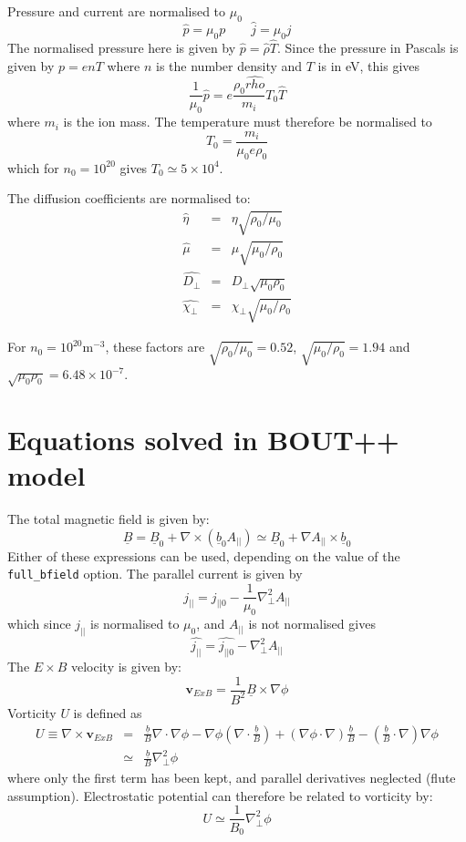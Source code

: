 \documentclass[12pt]{article}
\newcommand{\Vec}[1]{\ensuremath{\mathbf{#1}}}
\newcommand{\Div}[1]{\ensuremath{\nabla\cdot #1 }}
\newcommand{\Curl}[1]{\ensuremath{\nabla\times #1 }}
\newcommand{\Bvec}{\ensuremath{\underline{B}}}
\newcommand{\bvec}{\ensuremath{\underline{b}}}
\newcommand{\apar}{\ensuremath{A_{||}}}
\begin{document}
Pressure and current are normalised to $\mu_0$
\[
\hat{p} = \mu_0 p \qquad \hat{j} = \mu_0 j
\]
The normalised pressure here is given by $\hat{p} = \hat{\rho}\hat{T}$.
Since the pressure in Pascals is given by $p = enT$ where $n$ is the number
density and $T$ is in eV, this gives
\[
\frac{1}{\mu_0}\hat{p} = e\frac{\rho_0\hat{rho}}{m_i} T_0\hat{T}
\]
where $m_i$ is the ion mass. The temperature must therefore be normalised to
\[
T_0 = \frac{m_i}{\mu_0 e \rho_0}
\]
which for $n_0=10^{20}$ gives $T_0\simeq 5\times 10^4$.

The diffusion coefficients are normalised to:
\begin{eqnarray*}
\hat{\eta} &=& \eta\sqrt{\rho_0 / \mu_0} \\
\hat{\mu} &=& \mu\sqrt{\mu_0/\rho_0} \\
\hat{D_\perp} &=& D_\perp\sqrt{\mu_0\rho_0} \\
\hat{\chi_\perp} &=& \chi_\perp\sqrt{\mu_0/\rho_0}
\end{eqnarray*}

For $n_0=10^{20}$m$^{-3}$, these factors are $\sqrt{\rho_0 / \mu_0} = 0.52$, $\sqrt{\mu_0/\rho_0}=1.94$ and $\sqrt{\mu_0\rho_0} = 6.48\times 10^{-7}$. 

\section{Equations solved in BOUT++ model}

The total magnetic field is given by:
\[
\Bvec = \Bvec_0 + \nabla\times\left(\bvec_0\apar\right) \simeq \Bvec_0 + \nabla\apar \times\bvec_0
\]
Either of these expressions can be used, depending on the value of the \texttt{full\_bfield} option. The parallel current is given by
\[
j_{||} = j_{||0} - \frac{1}{\mu_0}\nabla_\perp^2\apar
\]
which since $j_{||}$ is normalised to $\mu_0$, and $\apar$ is not normalised gives
\[
\hat{j_{||}} = \hat{j_{||0}} - \nabla_\perp^2\apar
\]
The $E\times B$ velocity is given by:
\[
\Vec{v}_{ExB} = \frac{1}{B^2}\Bvec\times\nabla\phi
\]
Vorticity $U$ is defined as 
\begin{eqnarray*}
U \equiv \Curl{\Vec{v}_{ExB}} &=& \frac{\bvec}{B}\Div{\nabla\phi} - \nabla\phi\left(\Div{\frac{\bvec}{B}}\right) + \left(\nabla\phi\cdot\nabla\right)\frac{\bvec}{B} - \left(\frac{\bvec}{B}\cdot\nabla\right)\nabla\phi \\
&\simeq& \frac{\bvec}{B}\nabla_\perp^2\phi
\end{eqnarray*}
where only the first term has been kept, and parallel derivatives neglected (flute assumption). Electrostatic potential can therefore be related to 
vorticity by:
\[
U \simeq \frac{1}{B_0}\nabla_\perp^2\phi
\]
\end{document}

